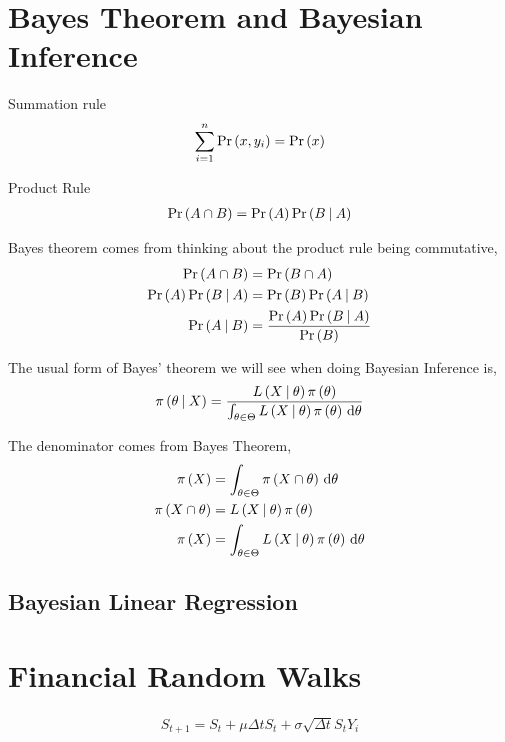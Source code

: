 \section{Bayes Theorem and Bayesian Inference}

Summation rule
\begin{align}
    \sum_{i=1}^{n} \mathrm{Pr} \left( x, y_i \right) = \mathrm{Pr} \left( x \right)
\end{align}

Product Rule
\begin{align}
    \mathrm{Pr} \left( A \cap B \right) = \mathrm{Pr} \left( A \right)\mathrm{Pr} \left( B \:\middle|\: A \right)
\end{align}

Bayes theorem comes from thinking about the product rule being commutative,
\begin{align}
    \mathrm{Pr} \left( A \cap B \right) &= \mathrm{Pr} \left( B \cap A \right) \\ 
    \mathrm{Pr} \left( A \right)\mathrm{Pr} \left( B \:\middle|\: A \right) &= \mathrm{Pr} \left( B \right)\mathrm{Pr} \left( A \:\middle|\: B \right)\\
    \mathrm{Pr} \left( A \:\middle|\: B \right) &= \frac{\mathrm{Pr} \left( A \right)\mathrm{Pr} \left( B \:\middle|\: A \right)}{\mathrm{Pr} \left( B \right)}
\end{align}

The usual form of Bayes' theorem we will see when doing Bayesian Inference is,
\begin{align}
    \pi \left( \theta \:\middle|\: X \right) = \frac{L\left( X \:\middle|\: \theta \right)\pi\left( \theta \right)}{\int_{\theta\in\Theta} L\left( X \:\middle|\: \theta \right)\pi\left( \theta \right) \,\mathrm{d} \theta}
\end{align}

The denominator comes from Bayes Theorem,
\begin{align*}
    \pi\left( X \right) &= \int_{\theta\in\Theta} \pi\left( X\cap\theta \right) \,\mathrm{d} \theta\\
    \pi\left( X\cap\theta \right) &= L\left( X \:\middle|\: \theta \right)\pi\left( \theta \right) \\ 
    \pi\left( X \right) &= \int_{\theta\in\Theta} L\left( X \:\middle|\: \theta \right)\pi\left( \theta \right) \,\mathrm{d} \theta
\end{align*}

\subsection{Bayesian Linear Regression}



\section{Financial Random Walks}

\begin{align*}
    S_{t+1} = S_t + \mu \Delta t S_t + \sigma \sqrt{\Delta t} S_t Y_i
\end{align*}


